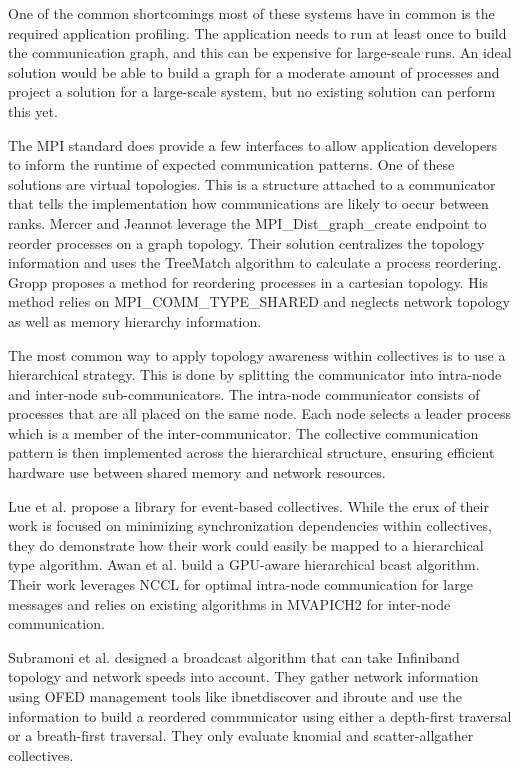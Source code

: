 One of the common shortcomings most of these systems have in common is the required application profiling.
The application needs to run at least once to build the communication graph, and this can be expensive for large-scale runs. 
An ideal solution would be able to build a graph for a moderate amount of processes and project a solution for a large-scale system, but no existing solution can perform this yet. 

The MPI standard does provide a few interfaces to allow application developers to inform the runtime of expected communication patterns.  
One of these solutions are virtual topologies. 
This is a structure attached to a communicator that tells the implementation how communications are likely to occur between ranks.
Mercer and Jeannot \cite{Mercer2011ImprvMPIWithRR} leverage the MPI\_Dist\_graph\_create endpoint to reorder processes on a graph topology.
Their solution centralizes the topology information and uses the TreeMatch algorithm \cite{Jeannot2010TreeMatch} to calculate a process reordering.
Gropp \cite{Gropp2019CartTopoMapping} proposes a method for reordering processes in a cartesian topology.
His method relies on MPI\_COMM\_TYPE\_SHARED and neglects network topology as well as memory hierarchy information.

The most common way to apply topology awareness within collectives is to use a hierarchical strategy.
This is done by splitting the communicator into intra-node and inter-node sub-communicators.
The intra-node communicator consists of processes that are all placed on the same node.
Each node selects a leader process which is a member of the inter-communicator.
The collective communication pattern is then implemented across the hierarchical structure, ensuring efficient hardware use between shared memory and network resources.

Lue et al. \cite{Luo2018ADAPT} propose a library for event-based collectives.
While the crux of their work is focused on minimizing synchronization dependencies within collectives, they do demonstrate how their work could easily be mapped to a hierarchical type algorithm.
Awan et al. \cite{Awan2016NCCLBcast} build a GPU-aware hierarchical bcast algorithm.
Their work leverages NCCL for optimal intra-node communication for large messages and relies on existing algorithms in MVAPICH2 for inter-node communication.

Subramoni et al. \cite{Subramoni2011SpeedAwareBcast} designed a broadcast algorithm that can take Infiniband topology and network speeds into account.
They gather network information using OFED management tools like ibnetdiscover and ibroute and use the information to build a reordered communicator using either a depth-first traversal or a breath-first traversal.
They only evaluate knomial and scatter-allgather collectives.

